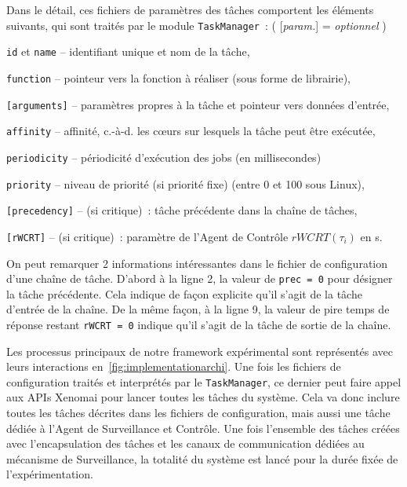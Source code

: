 \documentclass[french, a4paper, 11pt, twoside, pdftex]{StyleThese}
\begin{document}
	Dans le détail, ces fichiers de paramètres des tâches comportent les éléments suivants, qui sont traités par le module \texttt{TaskManager}~: \qquad( [\textit{param.}] = \textit{optionnel} )
	\begin{description}
		\item \texttt{id} et \texttt{name} -- identifiant unique et nom de la tâche,
		\item \texttt{function} -- pointeur vers la fonction à réaliser (sous forme de librairie),
		\item \texttt{[arguments]} -- paramètres propres à la tâche et pointeur vers données d'entrée,
		\item \texttt{affinity} -- affinité, c.-à-d. les cœurs sur lesquels la tâche peut être exécutée,
		\item \texttt{periodicity} -- périodicité d'exécution des jobs (en millisecondes)
		\item \texttt{priority} -- niveau de priorité (si priorité fixe) (entre 0 et 100 sous Linux),
		\item \texttt{[precedency]} -- (si critique)~: tâche précédente dans la chaîne de tâches,
		\item \texttt{[rWCRT]} -- (si critique)~: paramètre de l'Agent de Contrôle $rWCRT(\tau_i)$ en {\textmu}s.
	\end{description}

    On peut remarquer 2 informations intéressantes dans le fichier de configuration d'une chaîne de tâche. D'abord à la ligne 2, la valeur de \texttt{prec = 0} pour désigner la tâche précédente. Cela indique de façon explicite qu'il s'agit de la tâche d'entrée de la chaîne. De la même façon, à la ligne 9, la valeur de pire temps de réponse restant \texttt{rWCRT = 0} indique qu'il s'agit de la tâche de sortie de la chaîne. 
    
     Les processus principaux de notre framework expérimental sont représentés avec leurs interactions en~\autoref{fig:implementationarchi}. Une fois les fichiers de configuration traités et interprétés par le \texttt{TaskManager}, ce dernier peut faire appel aux APIs Xenomai pour lancer toutes les tâches du système. Cela va donc inclure toutes les tâches décrites dans les fichiers de configuration, mais aussi une tâche dédiée à l'Agent de Surveillance et Contrôle. Une fois l'ensemble des tâches créées avec l'encapsulation des tâches et les canaux de communication dédiées au mécanisme de Surveillance, la totalité du système est lancé pour la durée fixée de l'expérimentation.
    
\end{document}
